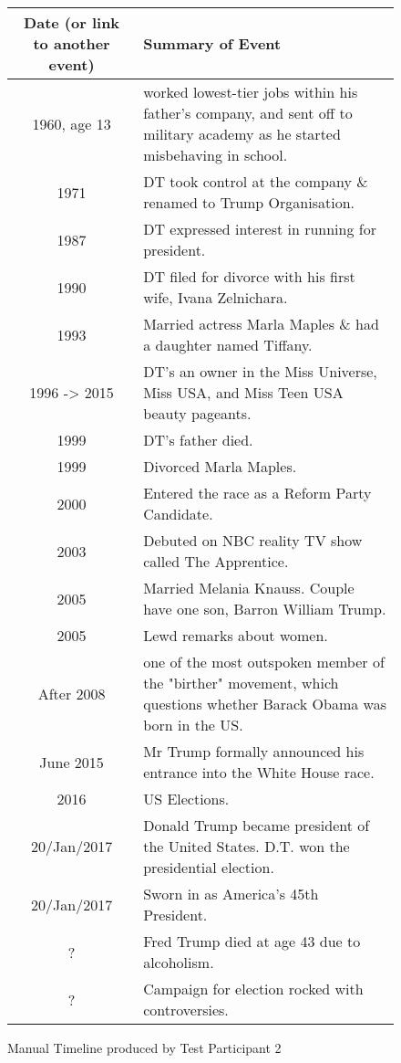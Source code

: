 \begin{figure}[H]
\begin{tabular}{|c|p{8.5cm}|}
\hline
Date (or link to another event) & Summary of Event\\
\hline
\hline
1960, age 13 & worked lowest-tier jobs within his father's company, and sent off to military academy as he started misbehaving in school.\\
\hline
1971 & DT took control at the company \& renamed to Trump Organisation.\\
\hline
1987 & DT expressed interest in running for president.\\
\hline
1990 & DT filed for divorce with his first wife, Ivana Zelnichara.\\
\hline
1993 & Married actress Marla Maples \& had a daughter named Tiffany.\\
\hline
1996 -> 2015 &  DT's an owner in the Miss Universe, Miss USA, and Miss Teen USA beauty pageants.\\
\hline
1999 & DT's father died.\\
\hline
1999 & Divorced Marla Maples.\\
\hline
2000 & Entered the race as a Reform Party Candidate.\\
\hline
2003 & Debuted on NBC reality TV show called The Apprentice.\\
\hline
2005 & Married Melania Knauss. Couple have one son, Barron William Trump.\\
\hline
2005 & Lewd remarks about women.\\
\hline
After 2008 & one of the most outspoken member of the "birther" movement, which questions whether Barack Obama was born in the US.\\
\hline
June 2015 & Mr Trump formally announced his entrance into the White House race.\\
\hline
2016 & US Elections.\\
\hline
20/Jan/2017 & Donald Trump became president of the United States. D.T. won the presidential election.\\
\hline
20/Jan/2017 & Sworn in as America's 45th President.\\
\hline
? & Fred Trump died at age 43 due to alcoholism.\\
\hline
? & Campaign for election rocked with controversies.\\
\hline
\end{tabular}
\caption{Manual Timeline produced by Test Participant 2}
\end{figure}

